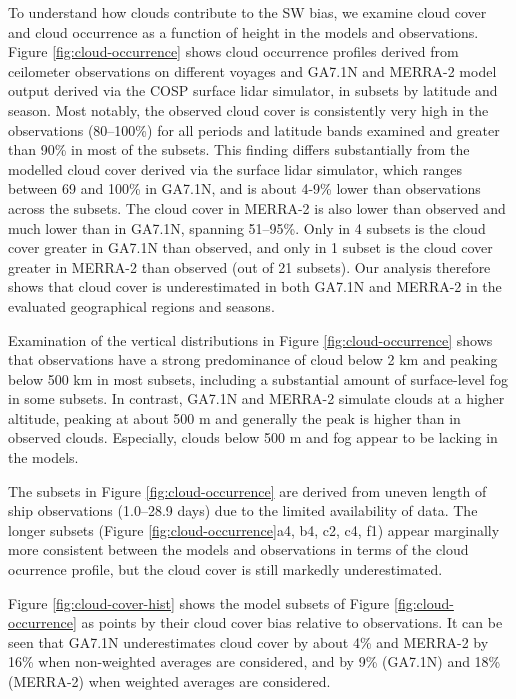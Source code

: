 To understand how clouds contribute to the SW bias, we examine cloud cover and
cloud occurrence as a function of height in the models and observations. Figure
\ref{fig:cloud-occurrence} shows cloud occurrence profiles derived from
ceilometer observations on different voyages and GA7.1N and MERRA-2 model
output derived via the COSP surface lidar simulator, in subsets by latitude and
season. Most notably, the observed cloud cover is consistently very high in the
observations (80--100\%) for all periods and latitude bands examined and
greater than 90\% in most of the subsets. This finding differs substantially
from the modelled cloud cover derived via the surface lidar simulator, which
ranges between 69 and 100\% in GA7.1N, and is about 4-9\% lower than
observations across the subsets. The cloud cover in MERRA-2 is also lower than
observed and much lower than in GA7.1N, spanning 51--95\%. Only in 4 subsets is
the cloud cover greater in GA7.1N than observed, and only in 1 subset is the
cloud cover greater in MERRA-2 than observed (out of 21 subsets).  Our analysis
therefore shows that cloud cover is underestimated in both GA7.1N and MERRA-2
in the evaluated geographical regions and seasons.

Examination of the vertical distributions in Figure \ref{fig:cloud-occurrence}
shows that observations have a strong predominance of cloud below 2 \unit{km}
and peaking below 500 \unit{km} in most subsets, including a substantial amount
of surface-level fog in some subsets. In contrast, GA7.1N and MERRA-2 simulate
clouds at a higher altitude, peaking at about 500 \unit{m} and generally the
peak is higher than in observed clouds. Especially, clouds below 500 m and fog
appear to be lacking in the models.

The subsets in Figure \ref{fig:cloud-occurrence} are derived from uneven
length of ship observations (1.0--28.9 days) due to the limited availability of data.
The longer subsets (Figure \ref{fig:cloud-occurrence}a4, b4, c2, c4, f1)
appear marginally more consistent between the models and observations
in terms of the cloud ocurrence profile, but the cloud cover is still markedly
underestimated.

Figure \ref{fig:cloud-cover-hist} shows the model subsets of Figure
\ref{fig:cloud-occurrence} as points by their cloud cover bias relative to
observations. It can be seen that GA7.1N underestimates cloud cover by about
4\% and MERRA-2 by 16\% when non-weighted averages are considered, and by 9\%
(GA7.1N) and 18\% (MERRA-2) when weighted averages are considered.

